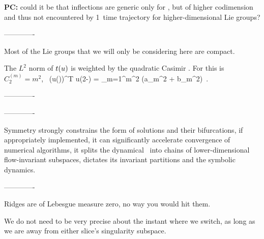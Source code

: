 {\bf PC:}{ could it be that inflections are generic only for ,
        but of higher codimension and thus not encountered
        by 1\dmn\ time trajectory for higher-dimensional Lie groups?}

-------------

Most of the Lie groups that we will only be considering here are
compact.

The $L^2$ norm of $t(u)$ is weighted by
the quadratic Casimir . For  this is
$C_2^{(m)} = m^2$,
\beq
\oint {}
     \, (\Lg u(\gSpace))^T \Lg u(2\pi-\gSpace)
= \sum_{m=1}^\infty m^2 \left(a_m^2 + b_m^2\right)
\,.


-------------




%

-------------


Symmetry strongly constrains the form of solutions and their
bifurcations, if appropriately implemented, it can significantly
accelerate convergence of numerical algorithms, it splits the dynamical
\statesp\ into chains of lower-dimensional flow-invariant subspaces,
dictates its invariant partitions and the symbolic dynamics.

-------------

Ridges are of Lebesgue measure zero, no way you would hit them.

We do not need to be very precise about the instant
where we switch, as long as we are away from either slice's singularity
subspace.

